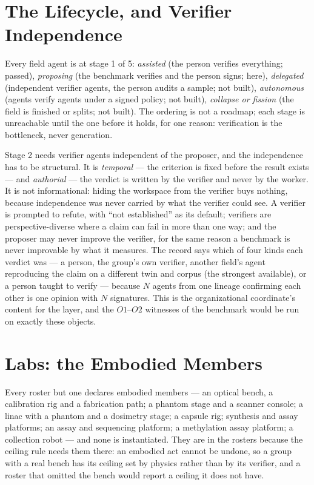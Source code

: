\documentclass[11pt]{article}
\theoremstyle{definition}
\begin{document}
\section{The Lifecycle, and Verifier Independence}\label{sec:lifecycle}

Every field agent is at stage 1 of 5: \emph{assisted} (the person verifies everything; passed), \emph{proposing} (the benchmark verifies and the person signs; here), \emph{delegated} (independent verifier agents, the person audits a sample; not built), \emph{autonomous} (agents verify agents under a signed policy; not built), \emph{collapse or fission} (the field is finished or splits; not built). The ordering is not a roadmap; each stage is unreachable until the one before it holds, for one reason: verification is the bottleneck, never generation.

Stage 2 needs verifier agents independent of the proposer, and the independence has to be structural. It is \emph{temporal} --- the criterion is fixed before the result exists --- and \emph{authorial} --- the verdict is written by the verifier and never by the worker. It is not informational: hiding the workspace from the verifier buys nothing, because independence was never carried by what the verifier could see. A verifier is prompted to refute, with ``not established'' as its default; verifiers are perspective-diverse where a claim can fail in more than one way; and the proposer may never improve the verifier, for the same reason a benchmark is never improvable by what it measures. The record says which of four kinds each verdict was --- a person, the group's own verifier, another field's agent reproducing the claim on a different twin and corpus (the strongest available), or a person taught to verify --- because $N$ agents from one lineage confirming each other is one opinion with $N$ signatures. This is the organizational coordinate's content for the layer, and the $O1$--$O2$ witnesses of the benchmark would be run on exactly these objects.

\section{Labs: the Embodied Members}\label{sec:labs}

Every roster but one declares embodied members --- an optical bench, a calibration rig and a fabrication path; a phantom stage and a scanner console; a linac with a phantom and a dosimetry stage; a capsule rig; synthesis and assay platforms; an assay and sequencing platform; a methylation assay platform; a collection robot --- and none is instantiated. They are in the rosters because the ceiling rule needs them there: an embodied act cannot be undone, so a group with a real bench has its ceiling set by physics rather than by its verifier, and a roster that omitted the bench would report a ceiling it does not have.
\end{document}
